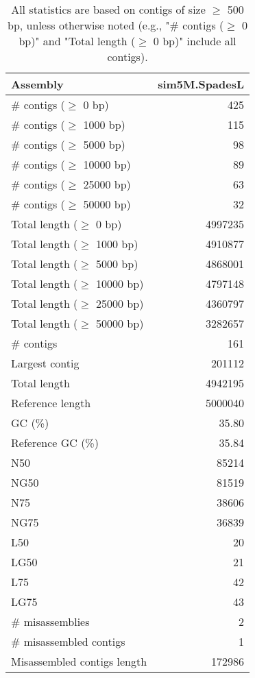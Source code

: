 \documentclass[12pt,a4paper]{article}
\begin{document}
\begin{table}[ht]
\begin{center}
\caption{All statistics are based on contigs of size $\geq$ 500 bp, unless otherwise noted (e.g., "\# contigs ($\geq$ 0 bp)" and "Total length ($\geq$ 0 bp)" include all contigs).}
\begin{tabular}{|l*{1}{|r}|}
\hline
Assembly & sim5M.SpadesL \\ \hline
\# contigs ($\geq$ 0 bp) & 425 \\ \hline
\# contigs ($\geq$ 1000 bp) & 115 \\ \hline
\# contigs ($\geq$ 5000 bp) & 98 \\ \hline
\# contigs ($\geq$ 10000 bp) & 89 \\ \hline
\# contigs ($\geq$ 25000 bp) & 63 \\ \hline
\# contigs ($\geq$ 50000 bp) & 32 \\ \hline
Total length ($\geq$ 0 bp) & 4997235 \\ \hline
Total length ($\geq$ 1000 bp) & 4910877 \\ \hline
Total length ($\geq$ 5000 bp) & 4868001 \\ \hline
Total length ($\geq$ 10000 bp) & 4797148 \\ \hline
Total length ($\geq$ 25000 bp) & 4360797 \\ \hline
Total length ($\geq$ 50000 bp) & 3282657 \\ \hline
\# contigs & 161 \\ \hline
Largest contig & 201112 \\ \hline
Total length & 4942195 \\ \hline
Reference length & 5000040 \\ \hline
GC (\%) & 35.80 \\ \hline
Reference GC (\%) & 35.84 \\ \hline
N50 & 85214 \\ \hline
NG50 & 81519 \\ \hline
N75 & 38606 \\ \hline
NG75 & 36839 \\ \hline
L50 & 20 \\ \hline
LG50 & 21 \\ \hline
L75 & 42 \\ \hline
LG75 & 43 \\ \hline
\# misassemblies & 2 \\ \hline
\# misassembled contigs & 1 \\ \hline
Misassembled contigs length & 172986 \\ \hline

\end{tabular}
\end{center}
\end{table}
\end{document}
